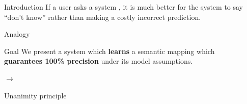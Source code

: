 \documentclass[final,table]{beamer}
\newlength{\sepwid}
\newlength{\onecolwid}
\begin{document}
\begin{frame}[t] %

\begin{columns}[t] %

\begin{column}{\sepwid}\end{column} %

\begin{column}{\onecolwid} %


\begin{block}{Introduction}
If a user asks a system ,
it is much better for the system to say ``don't know''
rather than making a costly incorrect prediction.
\end{block}

\begin{block}{Analogy}


\begin{figure}\centering

\end{figure}
\end{block}


\begin{block}{Goal}
We present a system which {\bf learns}
a {\color{BlueViolet} semantic mapping} which {\bf guarantees 100\% precision} under its model assumptions.

\centering
 {\color{BlueViolet}  $\rightarrow$ }
\end{block}

\begin{block}{Unanimity principle}




\end{block}
\end{column}
\end{columns}
\end{frame}
\end{document}
